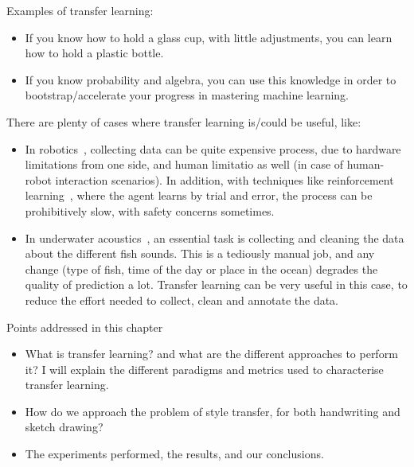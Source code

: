   \par Examples of transfer learning:
  \begin{itemize}
      \item If you know how to hold a glass cup, with little adjustments, you can learn how to hold a plastic bottle.
      \item If you know probability and algebra, you can use this knowledge in order to bootstrap/accelerate your progress in mastering machine learning.
  \end{itemize}

  \par There are plenty of cases where transfer learning is/could be useful, like:
  \begin{itemize}
    \item In robotics~\citep{konidaris2012robot,Konidaris:2012:TRL:2188385.2343689}, collecting data can be quite expensive process, due to hardware limitations from one side, and human limitatio as well (in case of human-robot interaction scenarios). In addition, with techniques like reinforcement learning~\citep{sutton2018reinforcement}, where the agent learns by trial and error, the process can be prohibitively slow, with safety concerns sometimes.
    \item In underwater acoustics~\citep{malfante2018automatic}, an essential task is collecting and cleaning the data about the different fish sounds. This is a tediously manual job, and any change (type of fish, time of the day or place in the ocean) degrades the quality of prediction a lot. Transfer learning can be very useful in this case, to reduce the effort needed to collect, clean and annotate the data.
  \end{itemize}

  \begin{mdframed}[backgroundcolor=blue!20]
      \begin{center}
          Points addressed in this chapter
      \end{center}

      \begin{itemize}
          \item What is transfer learning? and what are the different approaches to perform it? I will explain the different paradigms and metrics used to characterise transfer learning.
          \item How do we approach the problem of style transfer, for both handwriting and sketch drawing?
          \item The experiments performed, the results, and our conclusions.
      \end{itemize}
  \end{mdframed}

